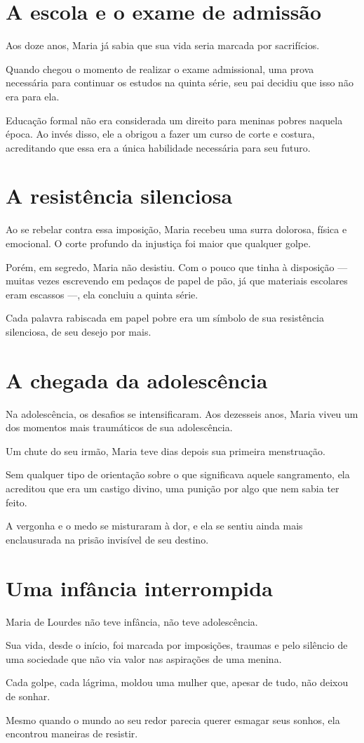\section*{A escola e o exame de admissão}

Aos doze anos, Maria já sabia que sua vida seria marcada por sacrifícios.

Quando chegou o momento de realizar o exame admissional, uma prova necessária para continuar os estudos na quinta série, seu pai decidiu que isso não era para ela.

Educação formal não era considerada um direito para meninas pobres naquela época. Ao invés disso, ele a obrigou a fazer um curso de corte e costura, acreditando que essa era a única habilidade necessária para seu futuro.

\section*{A resistência silenciosa}

Ao se rebelar contra essa imposição, Maria recebeu uma surra dolorosa, física e emocional. O corte profundo da injustiça foi maior que qualquer golpe.

Porém, em segredo, Maria não desistiu. Com o pouco que tinha à disposição — muitas vezes escrevendo em pedaços de papel de pão, já que materiais escolares eram escassos —, ela concluiu a quinta série.

Cada palavra rabiscada em papel pobre era um símbolo de sua resistência silenciosa, de seu desejo por mais.

\section*{A chegada da adolescência}

Na adolescência, os desafios se intensificaram. Aos dezesseis anos, Maria viveu um dos momentos mais traumáticos de sua adolescência.

Um chute do seu irmão, Maria teve dias depois sua primeira menstruação.

Sem qualquer tipo de orientação sobre o que significava aquele sangramento, ela acreditou que era um castigo divino, uma punição por algo que nem sabia ter feito.

A vergonha e o medo se misturaram à dor, e ela se sentiu ainda mais enclausurada na prisão invisível de seu destino.

\section*{Uma infância interrompida}

Maria de Lourdes não teve infância, não teve adolescência.

Sua vida, desde o início, foi marcada por imposições, traumas e pelo silêncio de uma sociedade que não via valor nas aspirações de uma menina.

Cada golpe, cada lágrima, moldou uma mulher que, apesar de tudo, não deixou de sonhar.

Mesmo quando o mundo ao seu redor parecia querer esmagar seus sonhos, ela encontrou maneiras de resistir.